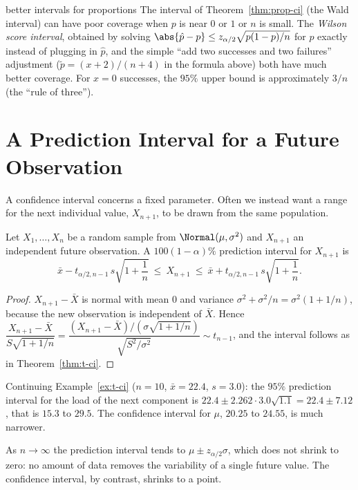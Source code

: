 \begin{interview}{better intervals for proportions}
The interval of Theorem~\ref{thm:prop-ci} (the Wald interval) can have poor coverage when $p$ is near $0$ or $1$ or $n$ is small. The \emph{Wilson score interval}, obtained by solving $\abs{\hat{p}-p}\le z_{\alpha/2}\sqrt{p(1-p)/n}$ for $p$ exactly instead of plugging in $\hat{p}$, and the simple ``add two successes and two failures'' adjustment ($\tilde{p}=(x+2)/(n+4)$ in the formula above) both have much better coverage. For $x=0$ successes, the $95\%$ upper bound is approximately $3/n$ (the ``rule of three'').
\end{interview}

\section{A Prediction Interval for a Future Observation}

A confidence interval concerns a fixed parameter. Often we instead want a range for the next individual value, $X_{n+1}$, to be drawn from the same population.

\begin{theorem}\label{thm:pi}
Let $X_1,\dots,X_n$ be a random sample from $\Normal(\mu,\sigma^2)$ and $X_{n+1}$ an independent future observation. A $100(1-\alpha)\%$ prediction interval for $X_{n+1}$ is
\[ \bar{x}-t_{\alpha/2,n-1}\,s\sqrt{1+\frac1n}\ \le\ X_{n+1}\ \le\ \bar{x}+t_{\alpha/2,n-1}\,s\sqrt{1+\frac1n}. \]
\end{theorem}

\begin{proof}
$X_{n+1}-\bar{X}$ is normal with mean $0$ and variance $\sigma^2+\sigma^2/n=\sigma^2(1+1/n)$, because the new observation is independent of $\bar{X}$. Hence $\dfrac{X_{n+1}-\bar{X}}{S\sqrt{1+1/n}}=\dfrac{(X_{n+1}-\bar{X})/(\sigma\sqrt{1+1/n})}{\sqrt{S^2/\sigma^2}}\sim t_{n-1}$, and the interval follows as in Theorem~\ref{thm:t-ci}.
\end{proof}

\begin{example}
Continuing Example~\ref{ex:t-ci} ($n=10$, $\bar{x}=22.4$, $s=3.0$): the $95\%$ prediction interval for the load of the next component is $22.4\pm2.262\cdot3.0\sqrt{1.1}=22.4\pm7.12$, that is $15.3$ to $29.5$. The confidence interval for $\mu$, $20.25$ to $24.55$, is much narrower.
\end{example}

As $n\to\infty$ the prediction interval tends to $\mu\pm z_{\alpha/2}\sigma$, which does not shrink to zero: no amount of data removes the variability of a single future value. The confidence interval, by contrast, shrinks to a point.

